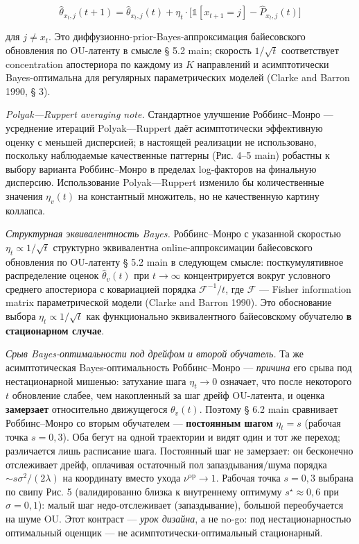 \documentclass[pdflatex,sn-mathphys-ay]{sn-jnl}
\begin{document}
\[\hat\theta_{x_t,j}(t+1) = \hat\theta_{x_t,j}(t) + \eta_t \cdot \bigl[\mathbb{1}[x_{t+1} = j] - \hat P_{x_t,j}(t)\bigr]\]



для \(j \ne x_t\). Это диффузионно-prior-Bayes-аппроксимация байесовского обновления по OU-латенту в смысле § 5.2 main; скорость \(1/\sqrt{t}\) соответствует concentration апостериора по каждому из \(K\) направлений и асимптотически Bayes-оптимальна для регулярных параметрических моделей (Clarke and Barron 1990, § 3).



\emph{Polyak---Ruppert averaging note.} Стандартное улучшение Роббинс--Монро --- усреднение итераций Polyak---Ruppert даёт асимптотически эффективную оценку с меньшей дисперсией; в настоящей реализации не использовано, поскольку наблюдаемые качественные паттерны (Рис. 4--5 main) робастны к выбору варианта Роббинс--Монро в пределах log-факторов на финальную дисперсию. Использование Polyak---Ruppert изменило бы количественные значения \(\eta_v(t)\) на константный множитель, но не качественную картину коллапса.



\emph{Структурная эквивалентность Bayes.} Роббинс--Монро с указанной скоростью \(\eta_t \propto 1/\sqrt{t}\) структурно эквивалентна online-аппроксимации байесовского обновления по OU-латенту § 5.2 main в следующем смысле: посткумулятивное распределение оценок \(\hat\theta_v(t)\) при \(t \to \infty\) концентрируется вокруг условного среднего апостериора с ковариацией порядка \(\mathcal{F}^{-1}/t\), где \(\mathcal{F}\) --- Fisher information matrix параметрической модели (Clarke and Barron 1990). Это обоснование выбора \(\eta_t \propto 1/\sqrt{t}\) как функционально эквивалентного байесовскому обучателю \textbf{в стационарном случае}.



\emph{Срыв Bayes-оптимальности под дрейфом и второй обучатель.} Та же асимптотическая Bayes-оптимальность Роббинс--Монро --- \emph{причина} его срыва под нестационарной мишенью: затухание шага \(\eta_t \to 0\) означает, что после некоторого \(t\) обновление слабее, чем накопленный за шаг дрейф OU-латента, и оценка \textbf{замерзает} относительно движущегося \(\theta_v(t)\). Поэтому § 6.2 main сравнивает Роббинс--Монро со вторым обучателем --- \textbf{постоянным шагом} \(\eta_t = s\) (рабочая точка \(s = 0{,}3\)). Оба бегут на одной траектории и видят один и тот же переход; различается лишь расписание шага. Постоянный шаг не замерзает: он бесконечно отслеживает дрейф, оплачивая остаточный пол запаздывания/шума порядка \(\sim s\sigma^2/(2\lambda)\) на координату вместо ухода \(\nu^{\text{op}} \to 1\). Рабочая точка \(s = 0{,}3\) выбрана по свипу Рис. 5 (валидированно близка к внутреннему оптимуму \(s^\star \approx 0{,}6\) при \(\sigma = 0{,}1\)): малый шаг недо-отслеживает (запаздывание), большой переобучается на шуме OU. Этот контраст --- \emph{урок дизайна}, а не no-go: под нестационарностью оптимальный оценщик --- не асимптотически-оптимальный стационарный.
\end{document}
